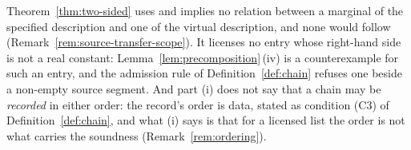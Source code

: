 
\begin{remark}\label{rem:two-sided-scope}
Theorem~\ref{thm:two-sided} uses and implies no relation between a marginal
of the specified description and one of the virtual description, and none
would follow (Remark~\ref{rem:source-transfer-scope}). It licenses no entry
whose right-hand side is not a real constant:
Lemma~\ref{lem:precomposition}\,(iv) is a counterexample for such an entry,
and the admission rule of Definition~\ref{def:chain} refuses one beside a
non-empty source segment. And part (i) does not say that a chain may be
\emph{recorded} in either order: the record's order is data, stated as
condition (C3) of Definition~\ref{def:chain}, and what (i) says is that for a
licensed list the order is not what carries the soundness
(Remark~\ref{rem:ordering}).
\end{remark}
